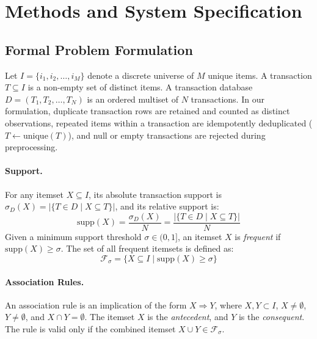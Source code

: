 \documentclass[twocolumn,10pt]{article}
\begin{document}
\section{Methods and System Specification}
\label{sec:methods}

\subsection{Formal Problem Formulation}
\label{sec:formal_spec}
Let $I = \{i_1, i_2, \dots, i_M\}$ denote a discrete universe of $M$ unique items. A transaction $T \subseteq I$ is a non-empty set of distinct items. A transaction database $D = (T_1, T_2, \dots, T_N)$ is an ordered multiset of $N$ transactions. In our formulation, duplicate transaction rows are retained and counted as distinct observations, repeated items within a transaction are idempotently deduplicated ($T \leftarrow \mathrm{unique}(T)$), and null or empty transactions are rejected during preprocessing.

\paragraph{Support.} For any itemset $X \subseteq I$, its absolute transaction support is $\sigma_D(X) = |\{T \in D \mid X \subseteq T\}|$, and its relative support is:
\begin{equation}
\mathrm{supp}(X) = \frac{\sigma_D(X)}{N} = \frac{|\{T \in D \mid X \subseteq T\}|}{N}
\end{equation}
Given a minimum support threshold $\sigma \in (0, 1]$, an itemset $X$ is \emph{frequent} if $\mathrm{supp}(X) \ge \sigma$. The set of all frequent itemsets is defined as:
\begin{equation}
\mathcal{F}_\sigma = \{X \subseteq I \mid \mathrm{supp}(X) \ge \sigma\}
\end{equation}

\paragraph{Association Rules.} An association rule is an implication of the form $X \Rightarrow Y$, where $X, Y \subset I$, $X \ne \emptyset$, $Y \ne \emptyset$, and $X \cap Y = \emptyset$. The itemset $X$ is the \emph{antecedent}, and $Y$ is the \emph{consequent}. The rule is valid only if the combined itemset $X \cup Y \in \mathcal{F}_\sigma$.
\end{document}
